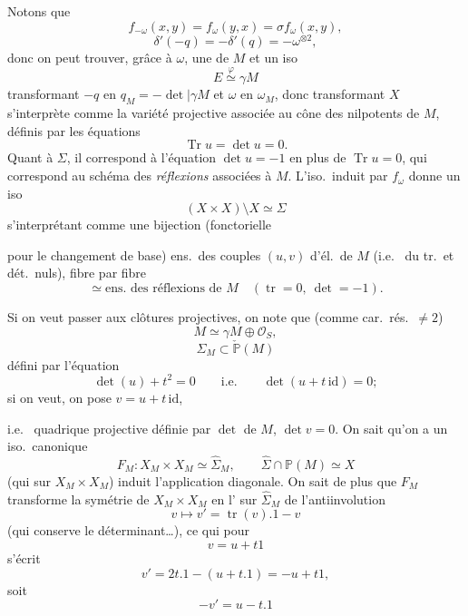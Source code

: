 \documentclass[11pt,a4paper]{article}
\begin{document}
\struck{\ill{}} Notons que 
\[
  f_{-\omega}(x,y) = f_{\omega}(y,x) = \sigma f_{\omega}(x,y),
\]
\[
  \delta'(-q) = -\delta'(q) = -\omega^{\otimes 2},
\]
donc  on peut trouver, grâce à $\omega$, une  de  \ill{} $M$ et un iso
\[
  E \overset{\varphi}{\simeq} \gamma M
\]
transformant $-q$ en $q_{M} = -\det \vert \gamma M$ et $\omega$ en $\omega_{M}$, donc transformant  \ill{} $X$ s'interprète comme la variété projective associée au cône des \add{\ill{}} nilpotents de $M$, définis par les équations
\[
  \operatorname{Tr} u = \det u = 0.
\]
Quant à $\Sigma$, il correspond à l'équation $\det u = -1$ en plus de $\operatorname{Tr} u = 0$, qui correspond au schéma des \emph{réflexions} associées à $M$. L'iso.\ induit par $f_{\omega}$ donne un iso
\[
  (X \times X) \setminus X \simeq \Sigma
\]
s'interprétant comme une bijection (fonctorielle

pour le changement de base)
ens.\ des couples $(u, v)$ d'él.\ de $M$ \struck{\ill{}}
(i.e.\ \ill{} du tr.\ et dét.\ nuls),   fibre par fibre
\[
  \simeq \text{ens.\ des réflexions de } M \quad (\operatorname{tr} = 0,\ \det = -1).
\]

Si on veut passer aux clôtures projectives, on note que (comme car.\ rés.\ $\neq 2$) \ill{}
\[
  M \simeq \gamma M \oplus \mathcal{O}_{S},
\]
\[
  \hat{\Sigma}_{M} \subset \check{\mathbb{P}}(M)
\]
défini par l'équation 
\[
  \det(u) + t^{2} = 0 \qquad \text{i.e.} \qquad \det(u + t\,\mathrm{id}) = 0 ;
\]
si on veut, on pose $v = u + t\,\mathrm{id}$,

i.e.\   quadrique projective définie par $\det$ de $M$, $\det v = 0$. On sait qu'on a un iso.\ canonique 
\[
  F_{M} : X_{M} \times X_{M} \simeq \hat{\Sigma}_{M}, \qquad
  \hat{\Sigma} \cap \mathbb{P}(M) \simeq X
\]
 (qui sur $X_{M} \times X_{M}$) induit l'application diagonale. On sait de plus que  $F_{M}$ transforme la symétrie de $X_{M} \times X_{M}$ en l' sur $\hat{\Sigma}_{M}$ de l'antiinvolution
\[
  v \longmapsto v' = \operatorname{tr}(v).1 - v
\]
(qui conserve le déterminant…), ce qui  pour
\[
  v = u + t1
\]
s'écrit
\[
  v' = 2t.1 - (u + t.1) = -u + t1,
\]
soit
\[
  -v' = u - t.1
\]
\end{document}
